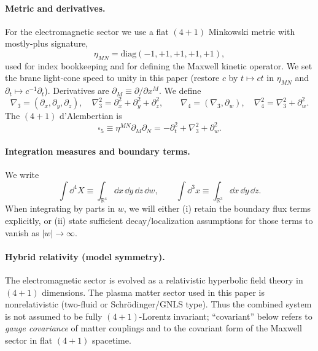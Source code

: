 \documentclass[11pt]{article}
\newcommand{\R}{\mathbb{R}}
\newcommand{\gradfour}{\nabla_4}
\newcommand{\gradthree}{\nabla_3}
\newcommand{\lapfour}{\nabla_4^2}
\newcommand{\lapthree}{\nabla_3^2}
\begin{document}
\paragraph{Metric and derivatives.}
For the electromagnetic sector we use a flat \((4+1)\) Minkowski metric with
mostly-plus signature,
\begin{equation}
\eta_{MN}=\mathrm{diag}(-1,+1,+1,+1,+1),
\label{eq:metric_def}
\end{equation}
used for index bookkeeping and for defining the Maxwell kinetic operator. We set
the brane light-cone speed to unity in this paper (restore \(c\) by
\(t\mapsto ct\) in \(\eta_{MN}\) and \(\partial_t\mapsto c^{-1}\partial_t\)).
Derivatives are \(\partial_M\equiv \partial/\partial x^M\). We define
\begin{equation}
\gradthree = (\partial_x,\partial_y,\partial_z),\quad
\lapthree = \partial_x^2+\partial_y^2+\partial_z^2,
\qquad
\gradfour = (\gradthree,\partial_w),\quad
\lapfour = \lapthree + \partial_w^2.
\label{eq:diff_ops}
\end{equation}
The \((4+1)\) d'Alembertian is
\begin{equation}
\square_5 \equiv \eta^{MN}\partial_M\partial_N
= -\partial_t^2 + \lapthree + \partial_w^2.
\label{eq:box5_def}
\end{equation}

\paragraph{Integration measures and boundary terms.}
We write
\begin{equation}
\int \dd^4X \equiv \int_{\R^4}\dd x\,\dd y\,\dd z\,\dd w,
\qquad
\int \dd^3x \equiv \int_{\R^3}\dd x\,\dd y\,\dd z.
\label{eq:measures}
\end{equation}
When integrating by parts in \(w\), we will either (i) retain the boundary flux
terms explicitly, or (ii) state sufficient decay/localization assumptions for
those terms to vanish as \(|w|\to\infty\).

\paragraph{Hybrid relativity (model symmetry).}
The electromagnetic sector is evolved as a relativistic hyperbolic field theory
in \((4+1)\) dimensions. The plasma matter sector used in this paper is
nonrelativistic (two-fluid or Schr\"odinger/GNLS type). Thus the combined system is
not assumed to be fully \((4+1)\)-Lorentz invariant; ``covariant'' below refers to
\emph{gauge covariance} of matter couplings and to the covariant form of the Maxwell
sector in flat \((4+1)\) spacetime.
\end{document}
